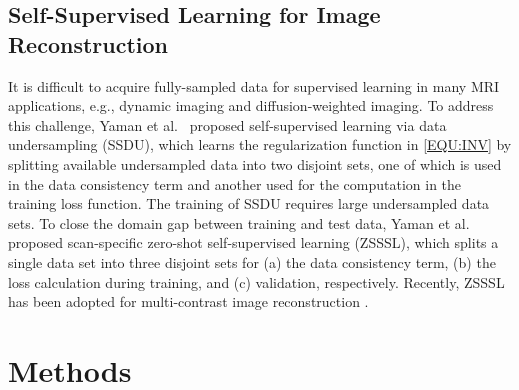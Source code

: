 \documentclass[journal,twoside,web]{ieeecolor}
\begin{document}

    \subsection{Self-Supervised Learning for Image Reconstruction}

    It is difficult to acquire fully-sampled data
    for supervised learning in many MRI applications,
    e.g., dynamic imaging and diffusion-weighted imaging.
    To address this challenge, Yaman et al.~\cite{yaman_2020_ssdu}
    proposed self-supervised learning via data undersampling (SSDU),
    which learns the regularization function in \cref{EQU:INV}
    by splitting available undersampled data into two disjoint sets,
    one of which is used in the data consistency term and
    another used for the computation in the training loss function.
    The training of SSDU requires large undersampled data sets.
    To close the domain gap between training and test data,
    Yaman et al.~\cite{yaman_2022_zs} proposed
    scan-specific zero-shot self-supervised learning (ZSSSL),
    which splits a single data set into three disjoint sets
    for (a) the data consistency term, (b) the loss calculation during training,
    and (c) validation, respectively.
    Recently, ZSSSL has been adopted for multi-contrast image reconstruction
    \cite{heydari_2024_jmaple}.

	\section{Methods}
\end{document}

